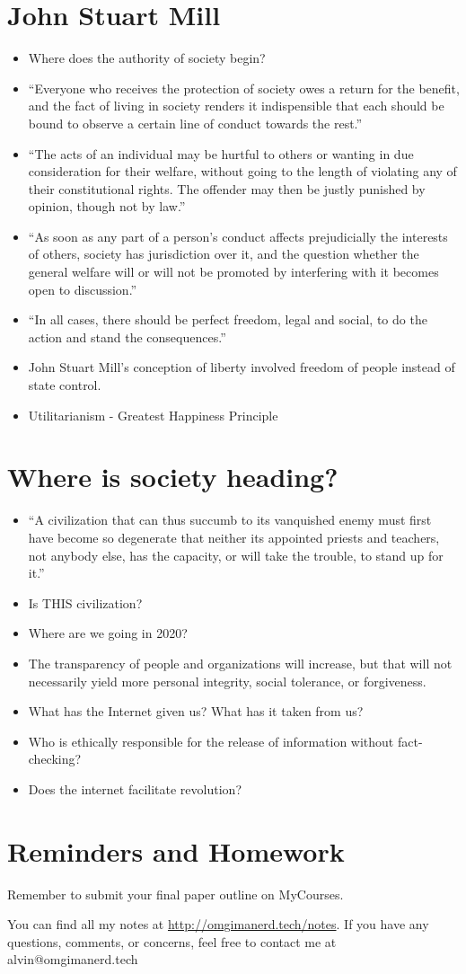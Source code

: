 \documentclass[letterpaper, 12pt]{article}
\begin{document}
\section*{John Stuart Mill}
\begin{itemize}
  \item Where does the authority of society begin?
  \item ``Everyone who receives the protection of society owes a return for the
    benefit, and the fact of living in society renders it indispensible that
    each should be bound to observe a certain line of conduct towards the
    rest.''
  \item ``The acts of an individual may be hurtful to others or wanting in due
    consideration for their welfare, without going to the length of violating
    any of their constitutional rights. The offender may then be justly
    punished by opinion, though not by law.''
  \item ``As soon as any part of a person's conduct affects prejudicially the
    interests of others, society has jurisdiction over it, and the question
    whether the general welfare will or will not be promoted by interfering
    with it becomes open to discussion.''
  \item ``In all cases, there should be perfect freedom, legal and social, to
    do the action and stand the consequences.''
  \item John Stuart Mill's conception of liberty involved freedom of people
    instead of state control.
  \item Utilitarianism - Greatest Happiness Principle
\end{itemize}

\section*{Where is society heading?}
\begin{itemize}
  \item ``A civilization that can thus succumb to its vanquished enemy must
    first have become so degenerate that neither its appointed priests and
    teachers, not anybody else, has the capacity, or will take the trouble, to
    stand up for it.''
  \item Is THIS civilization?
  \item Where are we going in 2020?
  \item The transparency of people and organizations will increase, but that
    will not necessarily yield more personal integrity, social tolerance, or
    forgiveness.
  \item What has the Internet given us? What has it taken from us?
  \item Who is ethically responsible for the release of information without
    fact-checking?
  \item Does the internet facilitate revolution?
\end{itemize}

\section*{Reminders and Homework}
Remember to submit your final paper outline on MyCourses.

\begin{center}
  You can find all my notes at \url{http://omgimanerd.tech/notes}. If you have
  any questions, comments, or concerns, feel free to contact me at
  alvin@omgimanerd.tech
\end{center}
\end{document}
